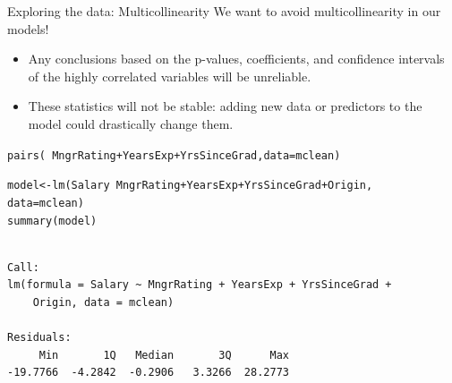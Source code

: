 \documentclass{beamer}\usepackage[]{graphicx}\usepackage[]{color}
\makeatletter
\newcommand{\hlopt}[1]{\textcolor[rgb]{1,0.894,0.769}{#1}}%
\newcommand{\hlstd}[1]{\textcolor[rgb]{1,0.894,0.769}{#1}}%
\newcommand{\hlkwb}[1]{\textcolor[rgb]{0.804,0.776,0.451}{#1}}%
\newcommand{\hlkwc}[1]{\textcolor[rgb]{0.78,0.941,0.545}{#1}}%
\newcommand{\hlkwd}[1]{\textcolor[rgb]{1,0.78,0.769}{#1}}%
\newenvironment{kframe}{%
 \def\at@end@of@kframe{}%
 \ifinner\ifhmode%
  \def\at@end@of@kframe{\end{minipage}}%
  \begin{minipage}{\columnwidth}%
 \fi\fi%
 \def\FrameCommand##1{\hskip\@totalleftmargin \hskip-\fboxsep
 \colorbox{shadecolor}{##1}\hskip-\fboxsep
     \hskip-\linewidth \hskip-\@totalleftmargin \hskip\columnwidth}%
 \MakeFramed {\advance\hsize-\width
   \@totalleftmargin\z@ \linewidth\hsize
   \@setminipage}}%
 {\par\unskip\endMakeFramed%
 \at@end@of@kframe}
\newenvironment{knitrout}{}{} %
\makeatother
\begin{document}
\begin{darkframes}
    
\begin{frame}[fragile]{Exploring the data: Multicollinearity}
      We want to avoid multicollinearity in our models! \pause
      \begin{itemize}[<+->]
        \item Any conclusions based on the p-values, coefficients, and confidence intervals of the highly correlated variables will be unreliable.
        \item These statistics will not be stable: adding new data or predictors to the model could drastically change them.
      \end{itemize}
      
\end{frame}
    
\begin{frame}[fragile]%
      \fontsize{9}{9}\selectfont
\begin{knitrout}
\begin{kframe}
\begin{alltt}
\hlkwd{pairs}\hlstd{(}\hlopt{~} \hlstd{MngrRating} \hlopt{+} \hlstd{YearsExp} \hlopt{+} \hlstd{YrsSinceGrad,} \hlkwc{data}\hlstd{=mclean)}
\end{alltt}
\end{kframe}


\end{knitrout}
\end{frame}
    
\begin{frame}[fragile]%
      \fontsize{8}{8}\selectfont
\begin{knitrout}
\begin{kframe}
\begin{alltt}
\hlstd{model} \hlkwb{<-} \hlkwd{lm}\hlstd{(Salary} \hlopt{~} \hlstd{MngrRating} \hlopt{+} \hlstd{YearsExp} \hlopt{+} \hlstd{YrsSinceGrad} \hlopt{+} \hlstd{Origin,}
           \hlkwc{data}\hlstd{=mclean)}
\hlkwd{summary}\hlstd{(model)}
\end{alltt}
\begin{verbatim}

Call:
lm(formula = Salary ~ MngrRating + YearsExp + YrsSinceGrad + 
    Origin, data = mclean)

Residuals:
     Min       1Q   Median       3Q      Max 
-19.7766  -4.2842  -0.2906   3.3266  28.2773 


\end{verbatim}
\end{kframe}
\end{knitrout}
\end{frame}
\end{darkframes}
\end{document}
